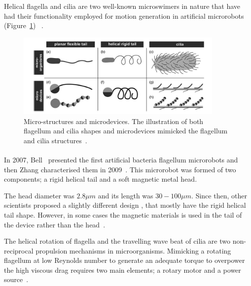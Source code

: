 \documentclass[12pt,a4paper,titlepage]{report}
\begin{document}
Helical flagella and cilia are two well-known microswimers in nature that have had their functionality employed 
for motion generation in artificial microrobots  (Figure~\ref{cilia}) ~\citep{gao2013bioinspired}. 



\begin{figure}
  \centering
    \includegraphics[width=0.9\textwidth]{cilia}
  \caption[Micro-structures and microdevices]{Micro-structures and microdevices. The illustration of both flagellum and cilia shapes and microdevices mimicked the flagellum and cilia 
structures~\citep{peyer2013bio}.}
	
  \label{cilia}
\end{figure}


 


\paragraph{}




In 2007, Bell~\citep{gao2013bioinspired} presented the first artificial bacteria flagellum microrobots and then
 Zhang characterised them in 2009~\citep{gao2013bioinspired}. This microrobot was formed of two 
components; a rigid helical tail and a soft magnetic metal head.

 The head diameter 
was $2.8 \mu  m$ and its length was $30-100 \mu m$. Since then, other scientists proposed a slightly different design 
, that mostly have the rigid helical tail shape. However, in some cases the magnetic
 materials is used in the tail of the device rather than the head~\citep{gao2013bioinspired}. 


The helical rotation of flagella and the travelling wave beat of cilia are two non-reciprocal propulsion
 mechanisms in microorganisms. Mimicking a rotating flagellum at low Reynolds number to generate an 
adequate torque to overpower the high viscous drag requires two main elements; a rotary motor and a
 power source~\citep{qiunanohelices}. 
\end{document}
